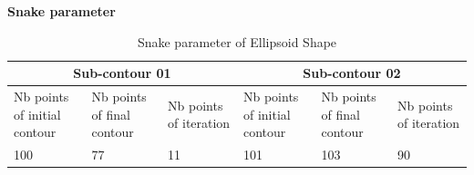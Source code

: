 \textbf{Snake parameter}

\begin{table}[H]
    \begin{tabular}{ |p{2cm}|p{2cm}|p{2cm}|p{2cm}|p{2cm}|p{2cm}| }
        \hline
        \multicolumn{3}{|c|}{Sub-contour 01} & \multicolumn{3}{|c|}{Sub-contour 02} \\
        \hline
        Nb points of initial contour &
        Nb points of final contour &
        Nb points of iteration &
        Nb points of initial contour &
        Nb points of final contour &
        Nb points of iteration
        \\
        \hline
        100   &  77    &  11  & 101  & 103  & 90 \\

        \hline
    \end{tabular}
    \caption{Snake parameter of Ellipsoid Shape}
    \label{tab:table03}
\end{table}


